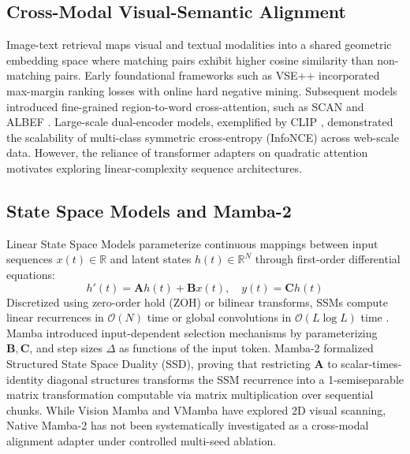 \documentclass[journal]{IEEEtran}
\begin{document}
\subsection{Cross-Modal Visual-Semantic Alignment}
Image-text retrieval maps visual and textual modalities into a shared geometric embedding space where matching pairs exhibit higher cosine similarity than non-matching pairs. Early foundational frameworks such as VSE++ \cite{faghri2017vse++} incorporated max-margin ranking losses with online hard negative mining. Subsequent models introduced fine-grained region-to-word cross-attention, such as SCAN \cite{lee2018stacked} and ALBEF \cite{li2021align}. Large-scale dual-encoder models, exemplified by CLIP \cite{radford2021learning}, demonstrated the scalability of multi-class symmetric cross-entropy (InfoNCE) \cite{oord2018representation} across web-scale data. However, the reliance of transformer adapters on quadratic attention motivates exploring linear-complexity sequence architectures.

\subsection{State Space Models and Mamba-2}
Linear State Space Models parameterize continuous mappings between input sequences $x(t) \in \mathbb{R}$ and latent states $h(t) \in \mathbb{R}^N$ through first-order differential equations:
\begin{equation}
h'(t) = \mathbf{A} h(t) + \mathbf{B} x(t), \quad y(t) = \mathbf{C} h(t)
\label{eq:continuous_ssm}
\end{equation}
Discretized using zero-order hold (ZOH) or bilinear transforms, SSMs compute linear recurrences in $\mathcal{O}(N)$ time or global convolutions in $\mathcal{O}(L \log L)$ time \cite{gu2021efficiently, smith2022simplified}. Mamba \cite{gu2023mamba} introduced input-dependent selection mechanisms by parameterizing $\mathbf{B}, \mathbf{C}$, and step sizes $\Delta$ as functions of the input token. Mamba-2 \cite{dao2024transformers} formalized Structured State Space Duality (SSD), proving that restricting $\mathbf{A}$ to scalar-times-identity diagonal structures transforms the SSM recurrence into a 1-semiseparable matrix transformation computable via matrix multiplication over sequential chunks. While Vision Mamba \cite{zhu2024vision} and VMamba \cite{liu2024vmamba} have explored 2D visual scanning, Native Mamba-2 has not been systematically investigated as a cross-modal alignment adapter under controlled multi-seed ablation.
\end{document}
